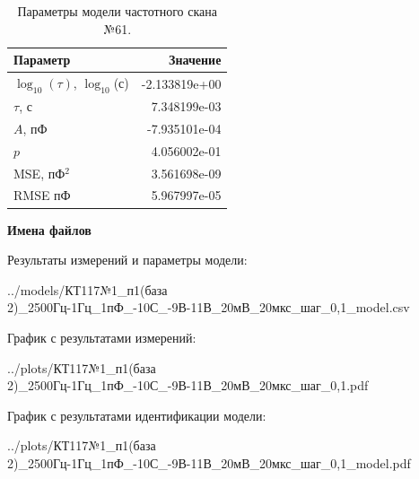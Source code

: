 \begin{table}[!ht]
    \centering
    \caption{Параметры модели частотного скана №61.}
    \begin{tabular}{|l|r|}
        \hline
        Параметр                                       & Значение                  \\ \hline
        $\log_{10}(\tau)$, $\log_{10}$(с)              & -2.133819e+00             \\ \hline
        $\tau$, с                                      & 7.348199e-03              \\ \hline
        $A$, пФ                                        & -7.935101e-04             \\ \hline
        $p$                                            & 4.056002e-01              \\ \hline
        MSE, пФ$^2$                                    & 3.561698e-09              \\ \hline
        RMSE пФ                                        & 5.967997e-05              \\ \hline
    \end{tabular}
    \label{table:frequency_scan_model_61}
\end{table}

\textbf{Имена файлов}

Результаты измерений и параметры модели:

\scriptsize../models/КТ117№1\_п1(база 2)\_2500Гц-1Гц\_1пФ\_-10С\_-9В-11В\_20мВ\_20мкс\_шаг\_0,1\_model.csv
\normalsize

График с результатами измерений:

\scriptsize../plots/КТ117№1\_п1(база 2)\_2500Гц-1Гц\_1пФ\_-10С\_-9В-11В\_20мВ\_20мкс\_шаг\_0,1.pdf
\normalsize

График с результатами идентификации модели:

\scriptsize../plots/КТ117№1\_п1(база 2)\_2500Гц-1Гц\_1пФ\_-10С\_-9В-11В\_20мВ\_20мкс\_шаг\_0,1\_model.pdf
\normalsize


